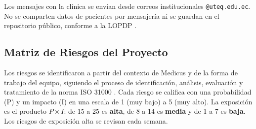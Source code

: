 Los mensajes con la cl{\'i}nica se env{\'i}an desde correos institucionales \texttt{@uteq.edu.ec}. No se comparten datos de pacientes por mensajer{\'i}a ni se guardan en el repositorio p{\'u}blico, conforme a la LOPDP \cite{lopdp2021}.

\subsection{Matriz de Riesgos del Proyecto}

Los riesgos se identificaron a partir del contexto de Medicus y de la forma de trabajo del equipo, siguiendo el proceso de identificaci{\'o}n, an{\'a}lisis, evaluaci{\'o}n y tratamiento de la norma ISO 31000 \cite{iso31000}. Cada riesgo se califica con una probabilidad (P) y un impacto (I) en una escala de 1 (muy bajo) a 5 (muy alto). La exposici{\'o}n es el producto $P \times I$: de 15 a 25 es \textbf{alta}, de 8 a 14 es \textbf{media} y de 1 a 7 es \textbf{baja}. Los riesgos de exposici{\'o}n alta se revisan cada semana.

